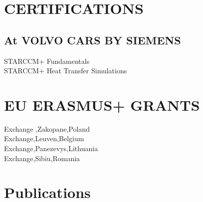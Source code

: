 \documentclass[]{hussain-resume-openfont}
\begin{document}
\begin{minipage}[t]{0.33\textwidth}

\section{CERTIFICATIONS}

\subsection{At VOLVO CARS BY SIEMENS}
STARCCM+ Fundamentals\\
STARCCM+ Heat Transfer Simulations\\ 
\sectionsep

\section{EU ERASMUS+ GRANTS}

\textbf{ } Exchange ,Zakopane,Poland \\
\textbf{} Exchange,Leuven,Belgium \\
\textbf{ } Exchange,Panezevys,Lithuania \\
\textbf{ } Exchange,Sibiu,Romania\\

\section{Publications} 
\renewcommand\refname{\vskip -1.5em} %


\nocite{*}

\end{minipage}
\end{document}
